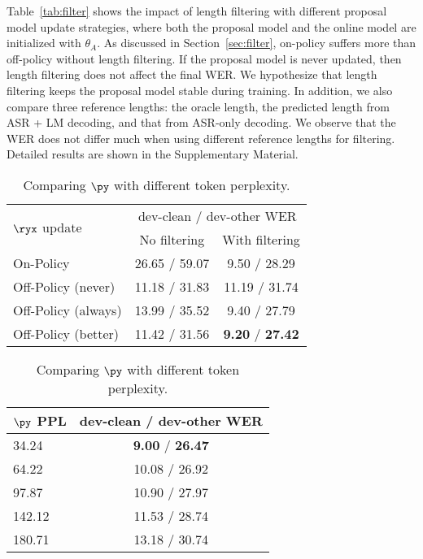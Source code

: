 Table~\ref{tab:filter} shows the impact of length filtering with different proposal model update strategies, where both the proposal model and the online model are initialized with $\theta_A$.
As discussed in Section~\ref{sec:filter}, on-policy suffers more than off-policy without length filtering.
If the proposal model is never updated, then length filtering does not affect the final WER. We hypothesize that length filtering keeps the proposal model stable during training.
In addition, we also compare three reference lengths: the oracle length, the predicted length from ASR + LM decoding, and that from ASR-only decoding. We observe that the WER does not differ much when using different reference lengths for filtering. Detailed results are shown in the Supplementary Material.

\begin{table}[ht]
    \small
    \caption{A comparison of WER with and without length filtering.}
    \label{tab:filter}
    \begin{center}
    \begin{tabular}{lcc}
        \toprule
        \multirow{2}{*}{$\ryx$ update} &  
        \multicolumn{2}{c}{dev-clean / dev-other WER} \\
        & No filtering & With filtering \\ 
        \midrule
        On-Policy             & 26.65 / 59.07 &  9.50 / 28.29 \\
        Off-Policy (never)    & 11.18 / 31.83 & 11.19 / 31.74 \\
        Off-Policy (always)   & 13.99 / 35.52 &  9.40 / 27.79 \\
        Off-Policy (better)   & 11.42 / 31.56 &  \textbf{9.20} / \textbf{27.42} \\
        \bottomrule
    \end{tabular}
    \end{center}
    \caption{Comparing $\py$ with different token perplexity.}
    \label{tab:lmppl}
    \begin{center}
    \begin{tabular}{lc}
        \toprule
        $\py$ PPL & dev-clean / dev-other WER \\
        \midrule
        34.24 &  \textbf{9.00} / \textbf{26.47} \\
        64.22 & 10.08 / 26.92 \\
        97.87 & 10.90 / 27.97 \\
        142.12 & 11.53 / 28.74 \\
        180.71 & 13.18 / 30.74 \\
        \bottomrule
    \end{tabular}
    \end{center}
\end{table}


